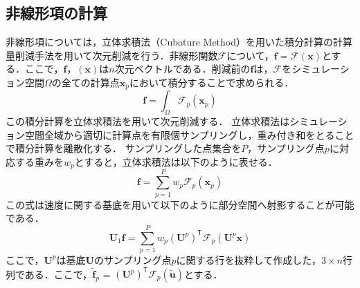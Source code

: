 \documentclass[a4j,12pt]{jreport}
\begin{document}
\subsection{非線形項の計算}\label{noLinear}
非線形項については，立体求積法（Cubature Method）を用いた積分計算の計算量削減手法を用いて次元削減を行う．非線形関数$\mathcal{F}$について，$\bm{f} = \mathcal{F}(\bm{x})$とする．ここで，$\bm{f}$，$(\bm{x})$は$n$次元ベクトルである．削減前の$\bm{f}$は，$\mathcal{F}$をシミュレーション空間$\Omega$の全ての計算点$\bm{x}_p$において積分することで求められる．
\[
	\bm{f} = \int_\Omega\mathcal{F}_p(\bm{x}_p)
\]
この積分計算を立体求積法を用いて次元削減する．
立体求積法はシミュレーション空間全域から適切に計算点を有限個サンプリングし，重み付き和をとることで積分計算を離散化する．
サンプリングした点集合を$P$，サンプリング点$p$に対応する重みを$w_p$とすると，立体求積法は以下のように表せる．
\[
	\bm{f} = \sum_{p=1}^Pw_p\mathcal{F}_p(\bm{x}_p)
\]
この式は速度に関する基底を用いて以下のように部分空間へ射影することが可能である．
\[
	\bm{U}_1\bm{f} = \sum_{p=1}^Pw_p(\bm{U}^p)^{\mathsf T}\mathcal{F}_p(\bm{U}^p\bm{x})
\]
ここで，$\bm{U}^p$は基底$\bm{U}$のサンプリング点$p$に関する行を抜粋して作成した，$3 \times n$行列である．ここで，$\bm{\widetilde{f}}_p$ = $(\bm{U}^p)^{\mathsf T}\mathcal{F}_p(\bm{\widetilde{u}})$とする．
\end{document}
